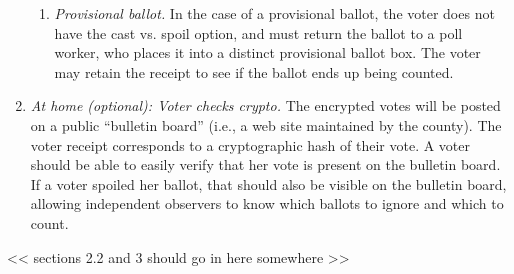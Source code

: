 \begin{enumerate}
\begin{enumerate}
\item {\em Provisional ballot.}
In the case of a provisional ballot, the voter does not have the cast vs. spoil option, and must return the ballot to a poll worker, who places it into a distinct provisional ballot box. The voter may retain the receipt to see if the ballot ends up being counted.
\end{enumerate}

\item {\em At home (optional): Voter checks crypto.}
The encrypted votes will be posted on a public ``bulletin board'' (i.e., a web site maintained by the county). The voter receipt corresponds to a cryptographic hash of their vote. A voter should be able to easily verify that her vote is present on the bulletin board. If a voter spoiled her ballot, that should also be visible on the bulletin board, allowing independent observers to know which ballots to ignore and which to count.
\end{enumerate}

<< sections 2.2 and 3 should go in here somewhere >>


